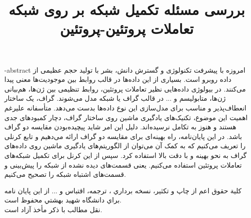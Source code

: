 \clearpage

\subject{علوم کامپیوتر }
\title{بررسی مسئله تکمیل شبکه بر روی شبکه تعاملات پروتئین-پروتئین}
\fa-abstract{\noindent
امروزه با پیشرفت تکنولوژی و گسترش دانش، بشر با تولید حجم عظیمی از داده روبرو است. بسیاری از این داده‌ها در قالب روابط بین موجودیت‌ها معنی پیدا می‌کنند. در بیولوژی داده‌هایی نظیر تعاملات پروتئین، روابط تنظیمی بین ژن‌ها، هم‌بیانی ژن‌ها، متابولیسم و ... در قالب گراف یا شبکه مدل می‌شوند. گراف، یک ساختار انعطاف‌پذیر و مناسب برای مدل‌سازی این نوع داده‌ها بدست می‌دهد. متأسفانه علیرغم اهمیت این موضوع، تکنیک‌های یادگیری ماشین روی ساختار گراف، دچار کمبود‌های جدی هستند و هنوز به تکامل نرسیده‌اند. دلیل این امر شاید پیچیده‌بودن مقایسه دو گراف باشد. در این پایان‌نامه، راه بهینه‌ای برای مقایسه دو گراف ارائه می‌دهیم و تابع کرنلی را تعریف می‌کنیم که به کمک آن می‌توان از الگوریتم‌های یادگیری ماشین روی داده‌های گراف به نحو بهینه و با دقت بالا استفاده کرد. سپس از این کرنل برای تکمیل شبکه‌های تعاملات پروتئین استفاده می‌کنیم. یعنی قسمت‌های دیده نشده از شبکه را پیش‌بینی و قسمت‌های اشتباه شبکه را تصحیح می‌کنیم.
}
\newpage
\thispagestyle{empty}
\vtitle
\newpage
\thispagestyle{empty}
\clearpage
~~~
\newpage
\thispagestyle{empty}
\vspace*{5cm}
{\dav
\begin{center}
كلية حقوق اعم از چاپ و تكثير، نسخه برداري ، ترجمه، اقتباس و ... از اين پايان نامه براي دانشگاه شهيد بهشتي محفوظ است.\\
 نقل  مطالب با ذكر مأخذ آزاد است.
\end{center}
}
